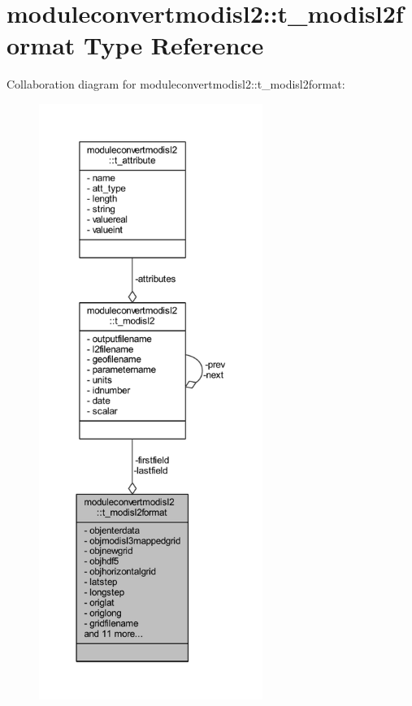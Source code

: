 \hypertarget{structmoduleconvertmodisl2_1_1t__modisl2format}{}\section{moduleconvertmodisl2\+:\+:t\+\_\+modisl2format Type Reference}
\label{structmoduleconvertmodisl2_1_1t__modisl2format}


Collaboration diagram for moduleconvertmodisl2\+:\+:t\+\_\+modisl2format\+:\nopagebreak
\begin{figure}[H]
\begin{center}
\leavevmode
\includegraphics[height=550pt]{structmoduleconvertmodisl2_1_1t__modisl2format__coll__graph}
\end{center}
\end{figure}
